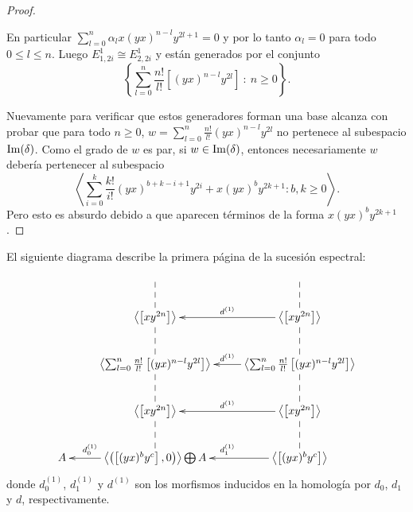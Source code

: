 \documentclass[fleqn,../tesis.tex]{subfiles}
\begin{document}
\begin{proof}
\begin{itemize}
		En particular $\sum_{l = 0}^n\alpha_lx(yx)^{n - l}y^{2l + 1} = 0$ y por lo tanto $\alpha_l = 0$ para todo $0 \leq l \leq n$.
		Luego $E_{1,2i}^1 \cong E_{2, 2i}^1$ y están generados por el conjunto
		\[
			\left\lbrace \sum_{l = 0}^n \frac{n!}{l!}\left[(yx)^{n - l}y^{2l}\right] \ :\ n \geq 0\right\rbrace.
		\]
	\end{itemize}
	Nuevamente para verificar que estos generadores forman una base alcanza con probar que para  todo $n \geq 0$,
	$w = \sum_{l = 0}^n \frac{n!}{l!}(yx)^{n - l}y^{2l}$ no pertenece al subespacio $\operatorname{Im}(\delta)$.
	Como el grado de $w$ es par, si $w \in \operatorname{Im}(\delta)$, entonces necesariamente $w$ debería pertenecer al subespacio
	\[
		\left\langle \sum_{i = 0}^k\frac{k!}{i!}(yx)^{b + k - i + 1}y^{2i} + x(yx)^by^{2k + 1} : b,k \geq 0 \right\rangle.
	\]
	Pero esto es absurdo debido a que aparecen términos de la forma $x(yx)^by^{2k + 1}$.
\end{proof}

El siguiente diagrama describe la primera página de la sucesión espectral:
\begin{align*}
\xymatrix{
	& & \\
	& \left\langle \left[xy^{2n}\right] \right\rangle \ar@{--}[u] & \left\langle \left[xy^{2n}\right] \right\rangle \ar[l]_{d^{(1)}} \ar@{--}[u]\\
	& \left\langle \sum_{l = 0}^n \frac{n!}{l!}\left[(yx)^{n - l}y^{2l}\right] \right\rangle \ar@{--}[u]
		& \left\langle \sum_{l = 0}^n \frac{n!}{l!}\left[(yx)^{n - l}y^{2l}\right] \right\rangle \ar[l]_{d^{(1)}} \ar@{--}[u]\\
	& \left\langle \left[xy^{2n}\right] \right\rangle \ar@{--}[u] & \left\langle \left[xy^{2n}\right] \right\rangle \ar[l]_{d^{(1)}} \ar@{--}[u]\\
	A & \left\langle \left(\left[(yx)^by^c\right], 0\right) \right\rangle \bigoplus A \ar[l]_(.7){d_0^{(1)}} \ar@{--}[u]
		& \left\langle \left[(yx)^by^c\right] \right\rangle \ar[l]_{d_1^{(1)}} \ar@{--}[u] \\
}
\end{align*}
donde $d_0^{(1)}$, $d_1^{(1)}$ y $d^{(1)}$ son los morfismos inducidos en la homología por $d_0$, $d_1$ y $d$, respectivamente.
\end{document}
